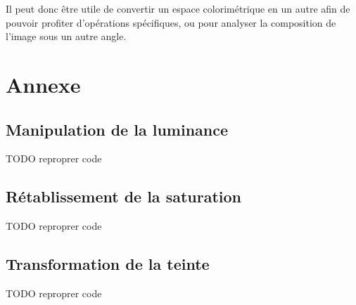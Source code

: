 \documentclass[a4paper]{article}
\begin{document}
Il peut donc être utile de convertir un espace colorimétrique en un autre afin de pouvoir profiter d'opérations spécifiques, ou pour analyser la composition de l'image sous un autre angle.

\clearpage

\section{Annexe}

\subsection{Manipulation de la luminance}

TODO reproprer code

\subsection{Rétablissement de la saturation}

TODO reproprer code

\subsection{Transformation de la teinte}

TODO reproprer code
\end{document}
